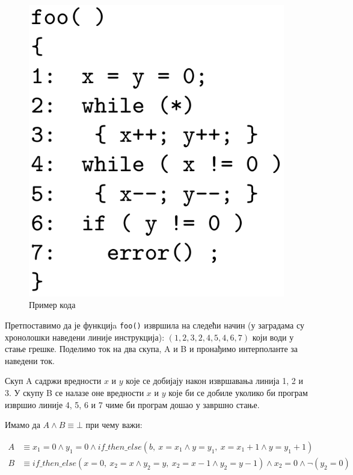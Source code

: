 \documentclass[a4paper]{article}
\begin{document}
{\begin{figure}[h!]
\begin{center}
    \includegraphics[scale=0.17]{./slike/interpolant_code.png}
\end{center}
\caption{Пример кода}
\label{fig:interpolant_example}
\end{figure}

Претпоставимо да је функцијa \texttt{foo()} извршила на следећи начин (у заградама су хронолошки наведени линије инструкција): $(1, 2, 3, 2, 4, 5, 4, 6, 7)$ који
води у стање грешке.  Поделимо ток на два скупа, A и B и пронађимо интерполанте за наведени ток.

Скуп A садржи вредности $x$ и $y$ које се добијају након извршавања линија 1, 2 и 3. У скупу B се налазе оне вредности $x$ и $y$
које би се добиле уколико би програм извршио линије 4, 5, 6 и 7 чиме би програм дошао у завршно стање.

Имамо да $A \land B \equiv \bot$ при чему важи:

\begin{equation*}
\begin{split}
    A & \equiv x_1 = 0 \land y_1 = 0 \land if\_then\_else(b,\  x = x_1 \land y = y_1,\ x = x_1 + 1 \land y = y_1 + 1)     \\
    B & \equiv if\_then\_else(x = 0,\ x_2 = x \land y_2 = y,\ x_2 = x - 1 \land y_2 = y-1) \land x_2 = 0 \land \neg (y_2 = 0)
\end{split}
\end{equation*}

}
\end{document}
